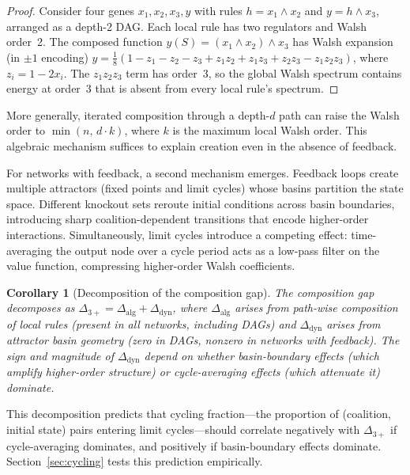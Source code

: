 \documentclass[10pt]{article}
\newtheorem{corollary}[proposition]{Corollary}
\begin{document}
\begin{proof}
Consider four genes $x_1, x_2, x_3, y$ with rules
$h = x_1 \wedge x_2$ and $y = h \wedge x_3$, arranged as a
depth-2 DAG. Each local rule has two regulators and Walsh order~2.
The composed function $y(S) = (x_1 \wedge x_2) \wedge x_3$ has
Walsh expansion (in $\pm 1$ encoding)
$y = \tfrac{1}{8}(1 - z_1 - z_2 - z_3 + z_1 z_2 + z_1 z_3
+ z_2 z_3 - z_1 z_2 z_3)$,
where $z_i = 1 - 2x_i$. The $z_1 z_2 z_3$ term has order~3,
so the global Walsh spectrum contains energy at order~3 that is
absent from every local rule's spectrum.
\end{proof}

More generally, iterated composition through a depth-$d$ path can
raise the Walsh order to $\min(n,\, d \cdot k)$, where $k$ is the
maximum local Walsh order. This algebraic mechanism suffices to
explain creation even in the absence of feedback.

For networks with feedback, a second mechanism emerges. Feedback
loops create multiple attractors (fixed points and limit cycles)
whose basins partition the state space. Different knockout sets
reroute initial conditions across basin boundaries, introducing
sharp coalition-dependent transitions that encode higher-order
interactions. Simultaneously, limit cycles introduce a competing
effect: time-averaging the output node over a cycle period acts as
a low-pass filter on the value function, compressing higher-order
Walsh coefficients.

\begin{corollary}[Decomposition of the composition gap]
\label{cor:decomposition}
The composition gap decomposes as
$\Delta_{3+} = \Delta_{\mathrm{alg}} + \Delta_{\mathrm{dyn}}$,
where $\Delta_{\mathrm{alg}}$ arises from path-wise composition of
local rules (present in all networks, including DAGs) and
$\Delta_{\mathrm{dyn}}$ arises from attractor basin geometry
(zero in DAGs, nonzero in networks with feedback). The sign and
magnitude of $\Delta_{\mathrm{dyn}}$ depend on whether
basin-boundary effects (which amplify higher-order structure) or
cycle-averaging effects (which attenuate it) dominate.
\end{corollary}

This decomposition predicts that cycling fraction---the proportion
of (coalition, initial state) pairs entering limit cycles---should
correlate negatively with $\Delta_{3+}$ if cycle-averaging
dominates, and positively if basin-boundary effects dominate.
Section~\ref{sec:cycling} tests this prediction empirically.
\end{document}

